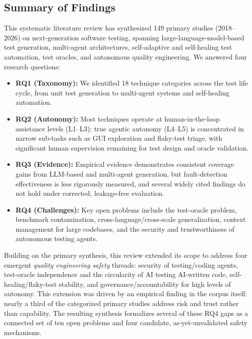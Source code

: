 %

\subsection{Summary of Findings}
This systematic literature review has synthesized 149 primary
studies (2018--2026) on next-generation software testing, spanning
large-language-model-based test generation, multi-agent architectures,
self-adaptive and self-healing test automation, test oracles, and
autonomous quality engineering. We answered four research questions:

\begin{itemize}
  \item \textbf{RQ1 (Taxonomy):} We identified 18 technique
        categories across the test life cycle, from unit test
        generation to multi-agent systems and self-healing automation.
  \item \textbf{RQ2 (Autonomy):} Most techniques operate at
        human-in-the-loop assistance levels (L1--L3); true agentic
        autonomy (L4--L5) is concentrated in narrow sub-tasks such as
        GUI exploration and flaky-test triage, with significant human
        supervision remaining for test design and oracle validation.
  \item \textbf{RQ3 (Evidence):} Empirical evidence demonstrates
        consistent coverage gains from LLM-based and multi-agent
        generation, but fault-detection effectiveness is less rigorously
        measured, and several widely cited findings do not hold under
        corrected, leakage-free evaluation.
  \item \textbf{RQ4 (Challenges):} Key open problems include the
        test-oracle problem, benchmark contamination,
        cross-language/cross-scale generalization, context management
        for large codebases, and the security and trustworthiness of
        autonomous testing agents.
\end{itemize}

Building on the primary synthesis, this review extended its scope to
address four emergent \emph{quality engineering safety} threads:
security of testing/coding agents, test-oracle independence and the
circularity of AI testing AI-written code, self-healing/flaky-test
stability, and governance/accountability for high levels of autonomy.
This extension was driven by an empirical finding in the corpus itself:
nearly a third of the categorized primary studies address risk and
trust rather than capability. The resulting synthesis formalizes
several of these RQ4 gaps as a connected set of ten open problems and
four candidate, as-yet-unvalidated safety mechanisms.


